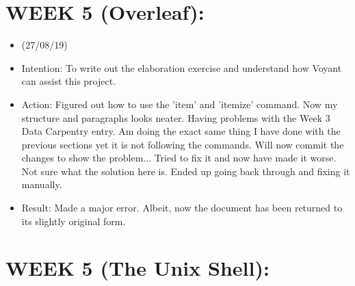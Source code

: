 \documentclass[a4paper,12pt]{article}
\begin{document}
\section{WEEK 5 (Overleaf):}

\begin{itemize}
    \item 

(27/08/19)

\item {Intention: To write out the elaboration exercise and understand how Voyant can assist this project.}

\item {Action: Figured out how to use the 'item' and 'itemize' command. Now my structure and paragraphs looks neater. Having problems with the Week 3 Data Carpentry entry. Am doing the exact same thing I have done with the previous sections yet it is not following the commands. Will now commit the changes to show the problem... Tried to fix it and now have made it worse. Not sure what the solution here is. Ended up going back through and fixing it manually.}

\item {Result: Made a major error. Albeit, now the document has been returned to its slightly original form.}

\end{itemize}

\section{WEEK 5 (The Unix Shell):}
\end{document}
